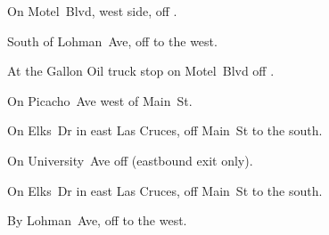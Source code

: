 
\begin{LocationList}

On  Motel~Blvd, west side, off  .

South of Lohman~Ave, off   to the west.

At the Gallon Oil truck stop on  Motel~Blvd off  .

\Location{\GarageHQ \Garage}
On  Picacho~Ave west of Main~St.

On Elks~Dr in east Las Cruces, off  Main~St to the south.

On University~Ave off   (eastbound exit only).

On Elks~Dr in east Las Cruces, off  Main~St to the south.

By Lohman~Ave, off   to the west.

\end{LocationList}
